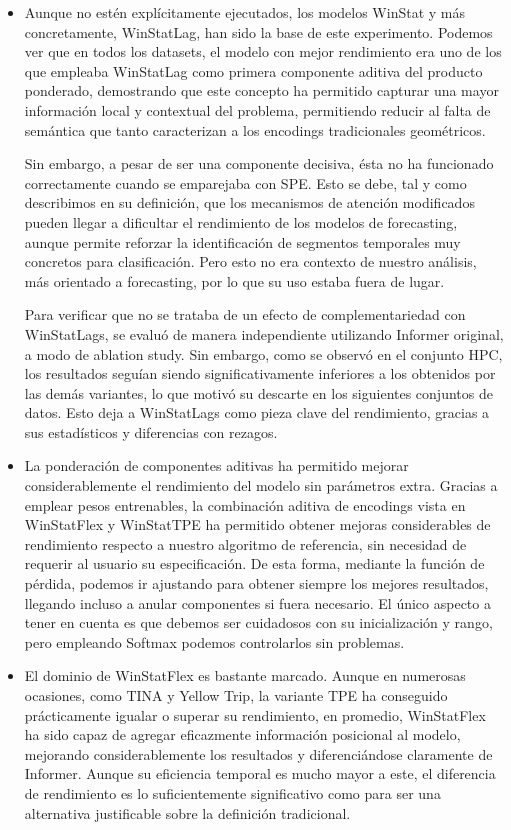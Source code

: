 \begin{itemize}
	\item Aunque no estén explícitamente ejecutados, los modelos WinStat y más concretamente, WinStatLag, han sido la base de este experimento. Podemos ver que en todos los datasets, el modelo con mejor rendimiento era uno de los que empleaba WinStatLag como primera componente aditiva del producto ponderado, demostrando que este concepto ha permitido capturar una mayor información local y contextual del problema, permitiendo reducir al falta de semántica que tanto caracterizan a los encodings tradicionales geométricos. 
	
	Sin embargo, a pesar de ser una componente decisiva, ésta no ha funcionado correctamente cuando se emparejaba con SPE. Esto se debe, tal y como describimos en su definición, que los mecanismos de atención modificados pueden llegar a dificultar el rendimiento de los modelos de forecasting, aunque permite reforzar la identificación de segmentos temporales muy concretos para clasificación. Pero esto no era contexto de nuestro análisis, más orientado a forecasting, por lo que su uso estaba fuera de lugar.
	
	 Para verificar que no se trataba de un efecto de complementariedad con WinStatLags, se evaluó de manera independiente utilizando Informer original, a modo de ablation study. Sin embargo, como se observó en el conjunto HPC, los resultados seguían siendo significativamente inferiores a los obtenidos por las demás variantes, lo que motivó su descarte en los siguientes conjuntos de datos. Esto deja a WinStatLags como pieza clave del rendimiento, gracias a sus estadísticos y diferencias con rezagos.
	 
	 \item La ponderación de componentes aditivas ha permitido mejorar considerablemente el rendimiento del modelo sin parámetros extra. Gracias a emplear pesos entrenables, la combinación aditiva de encodings vista en WinStatFlex y WinStatTPE ha permitido obtener mejoras considerables de rendimiento respecto a nuestro algoritmo de referencia, sin necesidad de requerir al usuario su especificación. De esta forma, mediante la función de pérdida, podemos ir ajustando para obtener siempre los mejores resultados, llegando incluso a anular componentes si fuera necesario. El único aspecto a tener en cuenta es que debemos ser cuidadosos con su inicialización y rango, pero empleando Softmax podemos controlarlos sin problemas.
	 
	 \item El dominio de WinStatFlex es bastante marcado. Aunque en numerosas ocasiones, como TINA y Yellow Trip, la variante TPE ha conseguido prácticamente igualar o superar su rendimiento, en promedio, WinStatFlex ha sido capaz de agregar eficazmente información posicional al modelo, mejorando considerablemente los resultados y diferenciándose claramente de Informer. Aunque su eficiencia temporal es mucho mayor a este, el diferencia de rendimiento es lo suficientemente significativo como para ser una alternativa justificable sobre la definición tradicional.
	 

\end{itemize}
